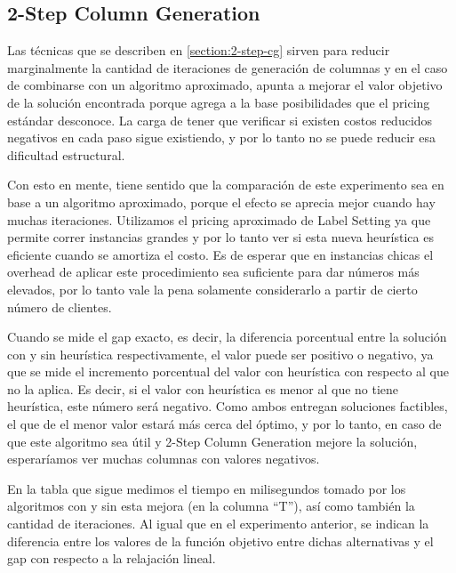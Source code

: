 \subsection{2-Step Column Generation}
\label{section:2-step-cg-testing}

Las técnicas que se describen en \ref{section:2-step-cg} sirven para reducir marginalmente la cantidad de iteraciones de generación de columnas y en el caso de combinarse con un algoritmo aproximado, apunta a mejorar el valor objetivo de la solución encontrada porque agrega a la base posibilidades que el pricing estándar desconoce. La carga de tener que verificar si existen costos reducidos negativos en cada paso sigue existiendo, y por lo tanto no se puede reducir esa dificultad estructural.

Con esto en mente, tiene sentido que la comparación de este experimento sea en base a un algoritmo aproximado, porque el efecto se aprecia mejor cuando hay muchas iteraciones. Utilizamos el pricing aproximado de Label Setting ya que permite correr instancias grandes y por lo tanto ver si esta nueva heurística es eficiente cuando se amortiza el costo. Es de esperar que en instancias chicas el overhead de aplicar este procedimiento sea suficiente para dar números más elevados, por lo tanto vale la pena solamente considerarlo a partir de cierto número de clientes. 

Cuando se mide el gap exacto, es decir, la diferencia porcentual entre la solución con y sin heurística respectivamente, el valor puede ser positivo o negativo, ya que se mide el incremento porcentual del valor con heurística con respecto al que no la aplica. Es decir, si el valor con heurística es menor al que no tiene heurística, este número será negativo. Como ambos entregan soluciones factibles, el que de el menor valor estará más cerca del óptimo, y por lo tanto, en caso de que este algoritmo sea útil y 2-Step Column Generation mejore la solución, esperaríamos ver muchas columnas con valores negativos.

En la tabla que sigue medimos el tiempo en milisegundos tomado por los algoritmos con y sin esta mejora (en la columna ``T''), así como también la cantidad de iteraciones. Al igual que en el experimento anterior, se indican la diferencia entre los valores de la función objetivo entre dichas alternativas y el gap con respecto a la relajación lineal. 


